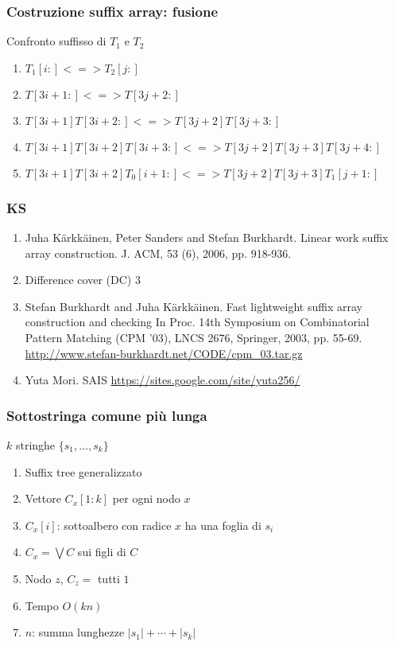 \begin{frame}
	\frametitle{Costruzione suffix array: fusione}
	Confronto suffisso di $T_{1}$ e $T_{2}$
	\begin{enumerate}
		\item
		      $T_{1}[i:] <=> T_{2}[j:]$
		\item
		      $T[3i+1:] <=> T[3j+2:]$
		\item
		      $T[3i+1]T[3i+2:] <=> T[3j+2]T[3j+3:]$
		\item
		      $T[3i+1]T[3i+2]T[3i+3:] <=> T[3j+2]T[3j+3]T[3j+4:]$
		\item
		      $T[3i+1]T[3i+2]T_{0}[i+1:] <=> T[3j+2]T[3j+3]T_{1}[j+1:]$
	\end{enumerate}
\end{frame}

\begin{frame}
	\frametitle{KS}
	\begin{enumerate}
		\item
		      Juha Kärkkäinen, Peter Sanders and Stefan Burkhardt.
		      Linear work suffix array construction. J. ACM, 53 (6), 2006, pp. 918-936.
		\item
		      Difference cover (DC) 3
		\item
		      Stefan Burkhardt and Juha Kärkkäinen.
		      Fast lightweight suffix array construction and checking
		      In Proc. 14th Symposium on Combinatorial Pattern Matching (CPM '03), LNCS 2676,
		      Springer, 2003, pp. 55-69. \url{http://www.stefan-burkhardt.net/CODE/cpm_03.tar.gz}
		\item
		      Yuta Mori.
		      SAIS \url{https://sites.google.com/site/yuta256/}
	\end{enumerate}
\end{frame}


\begin{frame}[fragile]
	\frametitle{Sottostringa comune più lunga}
	\begin{block}{$k$ stringhe $\{s_{1}, \ldots , s_{k}\}$}
		\begin{enumerate}[<+->]
			\item
			      Suffix tree generalizzato
			\item
			      Vettore $C_{x}[1:k]$ per ogni nodo $x$
			\item
			      $C_{x}[i]$: sottoalbero con radice $x$ ha una foglia di $s_{i}$
			\item
			      $C_{x} = \bigvee C$ sui figli di $C$
			\item
			      Nodo $z$, $C_{z}=$ tutti ${1}$
			\item
			      Tempo $O(kn)$
			\item
			      $n$: summa lunghezze $|s_{1}| + \cdots + |s_{k}|$
		\end{enumerate}
	\end{block}
\end{frame}


